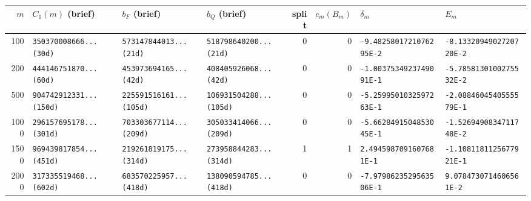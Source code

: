 \begin{tabular}{rlllrrll}%
\hline%
$m$&$C_1(m)$ (brief)&$b_F$ (brief)&$b_Q$ (brief)&\textbf{split}&$c_m(B_m)$&$\delta_m$&$E_m$\\%
\hline%
100&\texttt{350370008666... (30d)}&\texttt{573147844013... (21d)}&\texttt{518798640200... (21d)}&0&0&\texttt{{-}9.4825801721076295E{-}2}&\texttt{{-}8.1332094902720720E{-}2}\\%
200&\texttt{444146751870... (60d)}&\texttt{453973694165... (42d)}&\texttt{408405926068... (42d)}&0&0&\texttt{{-}1.0037534923749091E{-}1}&\texttt{{-}5.7858130100275532E{-}2}\\%
500&\texttt{904742912331... (150d)}&\texttt{225591516161... (105d)}&\texttt{106931504288... (105d)}&0&0&\texttt{{-}5.2599501032597263E{-}1}&\texttt{{-}2.0884604540555579E{-}1}\\%
1000&\texttt{296157695178... (301d)}&\texttt{703303677114... (209d)}&\texttt{305033414066... (209d)}&0&0&\texttt{{-}5.6628491504853045E{-}1}&\texttt{{-}1.5269490834711748E{-}2}\\%
1500&\texttt{969439817854... (451d)}&\texttt{219261819175... (314d)}&\texttt{273958844283... (314d)}&1&1&\texttt{2.4945987091607681E{-}1}&\texttt{{-}1.1081181125677921E{-}1}\\%
2000&\texttt{317335519468... (602d)}&\texttt{683570225957... (418d)}&\texttt{138090594785... (418d)}&0&0&\texttt{{-}7.9798623529563506E{-}1}&\texttt{9.0784730714606561E{-}2}\\%
\hline%
\end{tabular}
